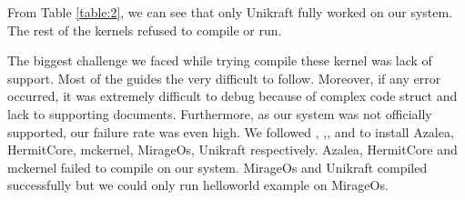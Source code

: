 \documentclass[11pt]{article}       %
\begin{document}
\begin{table}[htbp]
\caption{Experiment with various kernels}
\label{table:2}
\end{table}


From Table \ref{table:2}, we can see that only Unikraft fully worked on our system. The rest of the kernels refused to compile or run. 

The biggest challenge we faced while trying compile these kernel was lack of support. Most of the guides the very difficult to follow. Moreover, if any error occurred, it was extremely difficult to debug because of complex code struct and lack to supporting documents.  Furthermore, as our system was not officially supported, our failure rate was even high. We followed \cite{DEL22}, \cite{DEL23},\cite{DEL24}, \cite{DEL25}and \cite{DEL26}  to install  Azalea, HermitCore, mckernel, MirageOs, Unikraft respectively. Azalea, HermitCore and mckernel failed to compile on our system. MirageOs and Unikraft compiled successfully but we could only run helloworld example on MirageOs. 
\end{document}
